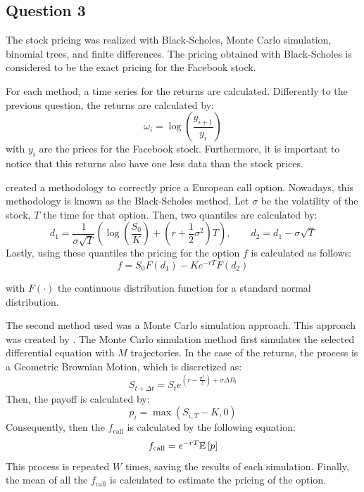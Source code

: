 \documentclass[11pt]{article}
\theoremstyle{definition}
\theoremstyle{remark}
\theoremstyle{remark}
\newcommand{\expp}[1]{e^{#1}}
\begin{document}
\subsection{Question 3}
The stock pricing was realized with Black-Scholes, Monte Carlo simulation,
binomial trees, and finite differences. The pricing obtained with Black-Scholes
is considered to be the exact pricing for the Facebook stock.

For each method, a time series for the returns are calculated. Differently to
the previous question, the returns are calculated by:
\begin{equation*}
  \omega_{i} = \log\left(\frac{y_{i + 1}}{y_{i}}\right)
\end{equation*}
with $y_{i}$ are the prices for the Facebook stock. Furthermore, it is important
to notice that this returns also have one less data than the stock prices.

\textcite{black1973} created a methodology to correctly price a European call
option. Nowadays, this methodology is known as the Black-Scholes method. Let
$\sigma$ be the volatility of the stock, $T$ the time for that option. Then, two
quantiles are calculated by:
\begin{equation*}
  d_{1} = \frac{1}{\sigma \sqrt{T}} \left(\log\left(\frac{S_{0}}{K}\right)
    + \left(r + \frac{1}{2}\sigma^{2}\right) T\right), \qquad d_{2} = d_{1} - \sigma \sqrt{T}
\end{equation*}
Lastly, using these quantiles the pricing for the option $f$ is calculated as follows:
\begin{equation*}
  f = S_{0} F(d_{1}) - K \expp{-rT} F(d_{2})
\end{equation*}

with $F(\cdot)$ the continuous distribution function for a standard normal
distribution.

The second method used was a Monte Carlo simulation approach. This approach was
created by \textcite{boyle1977}. The Monte Carlo simulation method first
simulates the selected differential equation with $M$ trajectories. In the case
of the returns, the process is a Geometric Brownian Motion, which is discretized
as:
\begin{equation*}
  S_{t + \Delta t} = S_{t}\expp{\left(r - \frac{\sigma^{2}}{2}\right) + \sigma \Delta B_{t}}
\end{equation*}
Then, the payoff is calculated by:
\begin{equation*}
  p_{i} = \max(S_{i,T} - K, 0)
\end{equation*}
Consequently, then the $f_{\text{call}}$ is calculated by the following
equation:
\begin{equation*}
  f_{\text{call}} = e^{-rT} \E{p}
\end{equation*}
This process is repeated $W$ times, saving the results of each simulation.
Finally, the mean of all the $f_{\text{call}}$ is calculated to estimate the
pricing of the option.
\end{document}
